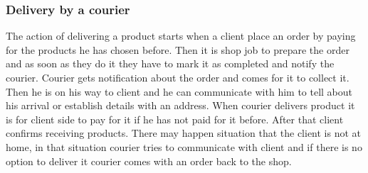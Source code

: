 \documentclass[../main.tex]{subfiles}
\begin{document}
\subsubsection{Delivery by a courier}
\vspace{5mm}
\vspace{5mm}


The action of delivering a product starts when a client place an order by paying for the products he has chosen before. Then it is shop job to prepare the order and as soon as they do it they have to mark it as completed and notify the courier. Courier gets notification about the order and comes for it to collect it. Then he is on his way to client and he can communicate with him to tell about his arrival or establish details with an address. When courier delivers product it is for client side to pay for it if he has not paid for it before. After that client confirms receiving products. There may happen situation that the client is not at home, in that situation courier tries to communicate with client and if there is no option to deliver it courier comes with an order back to the shop.
\end{document}
